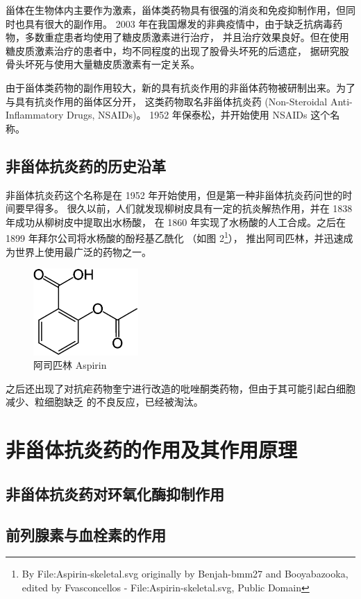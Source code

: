 \documentclass[12pt, a4paper, oneside]{ctexart}
\begin{document}
甾体在生物体内主要作为激素，甾体类药物具有很强的消炎和免疫抑制作用，但同时也具有很大的副作用。
2003 年在我国爆发的非典疫情中，由于缺乏抗病毒药物，多数重症患者均使用了糖皮质激素进行治疗，
并且治疗效果良好。但在使用糖皮质激素治疗的患者中，均不同程度的出现了股骨头坏死的后遗症，
据研究股骨头坏死与使用大量糖皮质激素有一定关系\cite{ref2}。

由于甾体类药物的副作用较大，新的具有抗炎作用的非甾体药物被研制出来。为了与具有抗炎作用的甾体区分开，
这类药物取名非甾体抗炎药 (Non-Steroidal Anti-Inflammatory Drugs, NSAIDs)。
1952 年保泰松，并开始使用 NSAIDs 这个名称。

\subsection{非甾体抗炎药的历史沿革}
非甾体抗炎药这个名称是在 1952 年开始使用，但是第一种非甾体抗炎药问世的时间要早得多。
很久以前，人们就发现柳树皮具有一定的抗炎解热作用，并在 1838 年成功从柳树皮中提取出水杨酸，
在 1860 年实现了水杨酸的人工合成。之后在 1899 年拜尔公司将水杨酸的酚羟基乙酰化
（如图 2\footnote{By File:Aspirin-skeletal.svg originally by Benjah-bmm27 and Booyabazooka, edited by Fvasconcellos - File:Aspirin-skeletal.svg, Public Domain}），
推出阿司匹林，并迅速成为世界上使用最广泛的药物之一。

\begin{figure}[htbp]
    \centering
    \includegraphics[width=4cm]{Aspirin-skeletal.pdf}
    \caption{阿司匹林 Aspirin}
    \end{figure}

之后还出现了对抗疟药物奎宁进行改造的吡唑酮类药物，但由于其可能引起白细胞减少、粒细胞缺乏
的不良反应，已经被淘汰。

\newpage
\section{非甾体抗炎药的作用及其作用原理}
\subsection{非甾体抗炎药对环氧化酶抑制作用}

\subsection{前列腺素与血栓素的作用}
\end{document}
